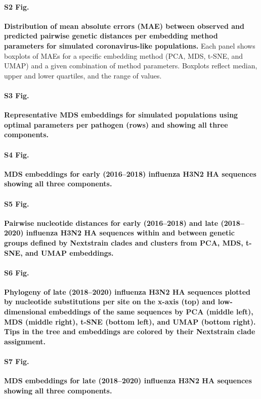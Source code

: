 \documentclass[10pt,letterpaper]{article}
\begin{document}
\paragraph*{S2 Fig.}
\label{S_Fig_simulated_coronavirus_errors}
{\bf Distribution of mean absolute errors (MAE) between observed and predicted pairwise genetic distances per embedding method parameters for simulated coronavirus-like populations.} Each panel shows boxplots of MAEs for a specific embedding method (PCA, MDS, t-SNE, and UMAP) and a given combination of method parameters. Boxplots reflect median, upper and lower quartiles, and the range of values.

\paragraph*{S3 Fig.}
\label{S_Fig_simulated_representative_mds_embeddings}
{\bf Representative MDS embeddings for simulated populations using optimal parameters per pathogen (rows) and showing all three components.}

\paragraph*{S4 Fig.}
\label{S_Fig_early_flu_mds_embeddings}
{\bf MDS embeddings for early (2016--2018) influenza H3N2 HA sequences showing all three components.}

\paragraph*{S5 Fig.}
\label{S_Fig_flu_within_between_group_distances}
{\bf Pairwise nucleotide distances for early (2016--2018) and late (2018--2020) influenza H3N2 HA sequences within and between genetic groups defined by Nextstrain clades and clusters from PCA, MDS, t-SNE, and UMAP embeddings.}

\paragraph*{S6 Fig.}
\label{S_Fig_late_flu_embeddings_by_clade}
{\bf Phylogeny of late (2018--2020) influenza H3N2 HA sequences plotted by nucleotide substitutions per site on the x-axis (top) and low-dimensional embeddings of the same sequences by PCA (middle left), MDS (middle right), t-SNE (bottom left), and UMAP (bottom right).
  Tips in the tree and embeddings are colored by their Nextstrain clade assignment.}

\paragraph*{S7 Fig.}
\label{S_Fig_late_flu_mds_embeddings}
{\bf MDS embeddings for late (2018--2020) influenza H3N2 HA sequences showing all three components.}
\end{document}
